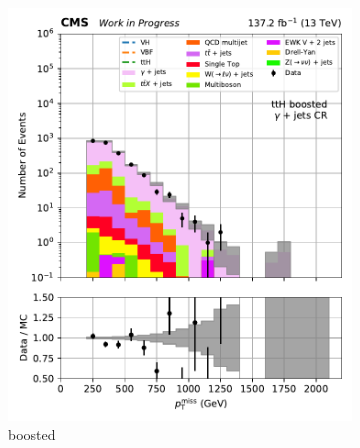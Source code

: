 \begin{figure}[htbp]
    \centering
    \begin{subfigure}[b]{0.24\textwidth}
        \includegraphics[width=\textwidth]{figures/region_plots/2016to18/region_5/ttH_boosted.pdf}
        \caption{\ttH boosted}
    \end{subfigure}
    \hfill
    \begin{subfigure}[b]{0.24\textwidth}

\end{subfigure}
\end{figure}
